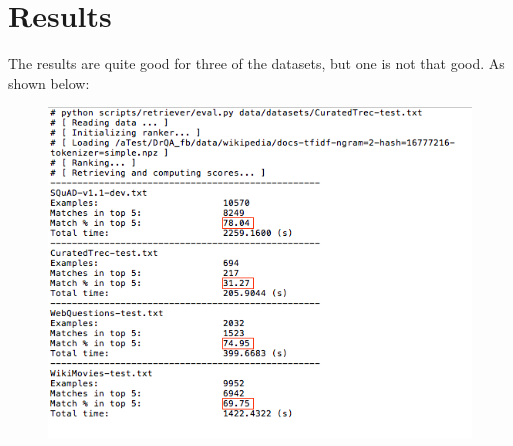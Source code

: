\documentclass[12pt]{article}
\numberwithin{equation}{section}
\begin{document}
\section{Results}
The results are quite good for three of the datasets, but one is not that good. As shown below:
	\begin{figure}[H]
		\includegraphics[width=\linewidth]{fig_QA/results.png}
		\label{fig:results}
	\end{figure} \par
\end{document}
